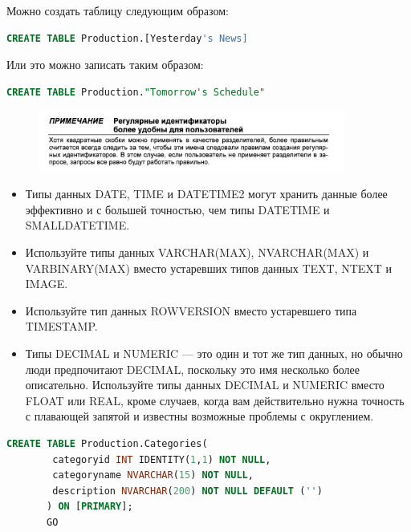Можно создать таблицу следующим образом: 

\begin{lstlisting}[label=lst:funcReturn, language=sql]
	CREATE TABLE Production.[Yesterday's News] 
\end{lstlisting}

Или это можно записать таким образом: 

\begin{lstlisting}[label=lst:funcReturn, language=sql]
	CREATE TABLE Production."Tomorrow's Schedule" 
\end{lstlisting}

\begin{figure}[h!]
	\begin{center}
		\includegraphics[width=0.9\textwidth]{img/advice14.png}
	\end{center}
	\captionsetup{justification=centering}
\end{figure}


\begin{itemize}
	\item Типы данных DATE, TIME и DATETIME2 могут хранить данные более эффективно и с
	большей точностью, чем типы DATETIME и SMALLDATETIME. 
	\item Используйте типы данных VARCHAR(MAX), NVARCHAR(MAX) и VARBINARY(MAX) вместо
	устаревших типов данных TEXT, NTEXT и IMAGE. 
	\item Используйте тип данных ROWVERSION вместо устаревшего типа TIMESTAMP. 
	\item Типы DECIMAL и NUMERIC — это один и тот же тип данных, но обычно люди предпочитают DECIMAL, поскольку это имя несколько более описательно. Используйте
	типы данных DECIMAL и NUMERIC вместо FLOAT или REAL, кроме случаев, когда вам
	действительно нужна точность с плавающей запятой и известны возможные
	проблемы с округлением. 
\end{itemize}


\begin{lstlisting}[label=lst:funcReturn, language=sql]
	CREATE TABLE Production.Categories(
		categoryid INT IDENTITY(1,1) NOT NULL,
		categoryname NVARCHAR(15) NOT NULL,
		description NVARCHAR(200) NOT NULL DEFAULT ('')
	   ) ON [PRIMARY];
	   GO 
\end{lstlisting}


